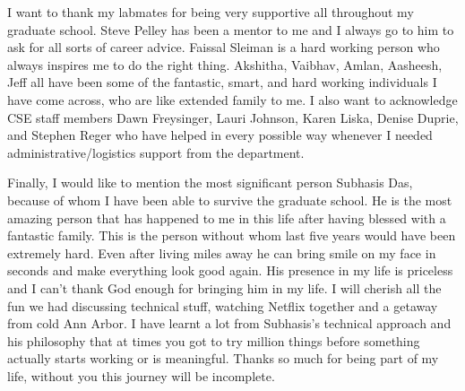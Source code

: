 I want to thank my labmates for being very supportive all throughout my graduate
school. Steve Pelley has been a mentor to me and I always go to him to ask for
all sorts of career advice. Faissal Sleiman is a hard working person who always
inspires me to do the right thing. Akshitha, Vaibhav, Amlan, Aasheesh, Jeff all
have been some of the fantastic, smart, and hard working individuals I have come
across, who are like extended family to me. I also want to acknowledge CSE staff
members Dawn Freysinger, Lauri Johnson, Karen Liska, Denise Duprie, and Stephen
Reger who have helped in every possible way whenever I needed
administrative/logistics support from the department.

Finally, I would like to mention the most significant person Subhasis Das,
because of whom I have been able to survive the graduate school. He is the most
amazing person that has happened to me in this life after having blessed with a
fantastic family. This is the person without whom last five years would have been
extremely hard. Even after living miles away he can bring smile on my face in
seconds and make everything look good again. His presence in my life is
priceless and I can't thank God enough for bringing him in my life.  I will
cherish all the fun we had discussing technical stuff, watching Netflix
together and a getaway from cold Ann Arbor. I have learnt a lot from Subhasis's
technical approach and his philosophy that at times you got to try million
things before something actually starts working or is meaningful. Thanks so much
for being part of my life, without you this journey will be incomplete.


